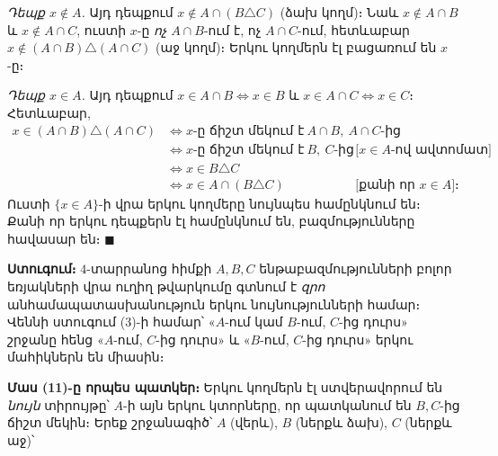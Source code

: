 \documentclass[11pt,a4paper]{article}
\newcommand{\symd}{\triangle}
\begin{document}
\emph{Դեպք $x\notin A$.} Այդ դեպքում $x\notin A\cap(B\symd C)$ (ձախ կողմ)։ Նաև $x\notin A\cap B$ և
$x\notin A\cap C$, ուստի $x$-ը \emph{ոչ} $A\cap B$-ում է, ոչ $A\cap C$-ում, հետևաբար
$x\notin(A\cap B)\symd(A\cap C)$ (աջ կողմ)։ Երկու կողմերն էլ բացառում են $x$-ը։ \checkmark

\emph{Դեպք $x\in A$.} Այդ դեպքում $x\in A\cap B\iff x\in B$ և $x\in A\cap C\iff x\in C$։ Հետևաբար,
\begin{align*}
x\in(A\cap B)\symd(A\cap C)
&\iff x\text{-ը ճիշտ մեկում է}\ A\cap B,\ A\cap C\text{-ից}\\
&\iff x\text{-ը ճիշտ մեկում է}\ B,\ C\text{-ից} &&\text{[}x\in A\text{-ով ավտոմատ]}\\
&\iff x\in B\symd C\\
&\iff x\in A\cap(B\symd C) &&\text{[քանի որ }x\in A\text{]։}
\end{align*}
Ուստի $\{x\in A\}$-ի վրա երկու կողմերը նույնպես համընկնում են։ Քանի որ երկու դեպքերն էլ համընկնում են,
բազմությունները հավասար են։ $\blacksquare$

\textbf{Ստուգում։} $4$-տարրանոց հիմքի $A,B,C$ ենթաբազմությունների բոլոր եռյակների վրա ուղիղ թվարկումը
գտնում է \emph{զրո} անհամապատասխանություն երկու նույնությունների համար։ Վեննի ստուգում (3)-ի համար՝
«$A$-ում կամ $B$-ում, $C$-ից դուրս» շրջանը հենց «$A$-ում, $C$-ից դուրս» և «$B$-ում, $C$-ից դուրս» երկու
մահիկներն են միասին։ \checkmark

\begin{center}
\end{center}

\textbf{Մաս (11)-ը որպես պատկեր։} Երկու կողմերն էլ ստվերավորում են \emph{նույն} տիրույթը՝ $A$-ի այն երկու
կտորները, որ պատկանում են $B,C$-ից ճիշտ մեկին։ Երեք շրջանագիծ՝ $A$ (վերև), $B$ (ներքև ձախ), $C$ (ներքև աջ)՝
\end{document}
